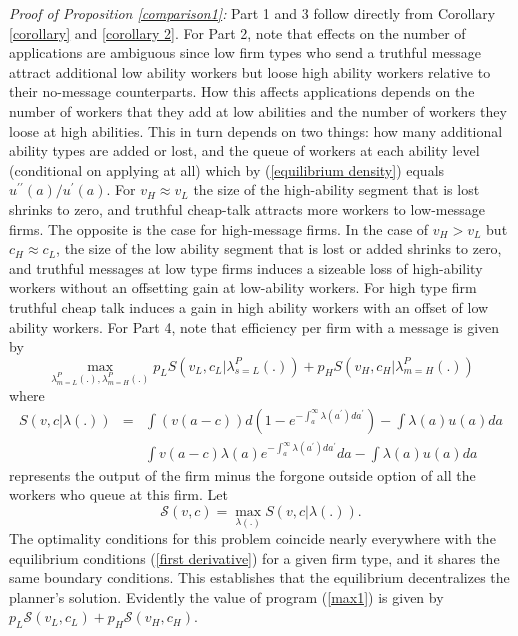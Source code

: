 \documentclass[12pt]{article}
\begin{document}
\noindent \textit{Proof of Proposition \ref{comparison1}:} Part 1 and 3 follow
directly from Corollary \ref{corollary} and \ref{corollary 2}. For Part 2, note
that effects on the number of applications are ambiguous since low firm
types who send a truthful message attract additional low ability workers but loose high ability workers relative to their no-message counterparts.
How this affects applications depends on the number of workers that they add at low abilities and the number of workers they loose at high abilities. This in turn depends on two things: how many additional ability types are added or lost, and the queue of workers at each ability level (conditional on applying at all) which by
(\ref{equilibrium density}) equals $u^{\prime \prime }(a)/u^{\prime }(a)$. For $v_{H}\approx v_{L}$ the size of the high-ability segment that is lost shrinks to zero, and
truthful cheap-talk attracts more workers to low-message firms. The opposite
is the case for high-message firms. In the case of $v_{H}> v_L$ but $c_H \approx c_L$, the size of the low ability segment that is lost or added shrinks to zero, and truthful messages at low type firms induces a sizeable loss of high-ability workers without an offsetting gain at low-ability workers. For high type firm truthful cheap talk induces a gain in high ability workers with an offset of low ability workers. For Part 4, note that efficiency per firm with a message is given by 
\begin{equation}
\max_{\lambda _{m=L}^{P}(.),\lambda _{m=H}^{P}(.)}p_{L}S(v_{L},c_{L}|\lambda _{s=L}^{P}(.))+p_{H}S(v_{H},c_{H}|\lambda
_{m=H}^{P}(.))  \label{max1}
\end{equation}%
where 
\begin{eqnarray*}
S(v,c|\lambda (.)) &=&\int \left( v(a-c)\right) d\left(
1-e^{-\int_{a}^{\infty }\lambda (a^{\prime })da^{\prime }}\right) -\int
\lambda (a)u(a)da \\
&&\int v(a-c)\lambda (a)e^{-\int_{a}^{\infty }\lambda (a^{\prime
})da^{\prime }}da-\int \lambda (a)u(a)da
\end{eqnarray*}%
represents the output of the firm minus the forgone outside option of all
the workers who queue at this firm. Let 
\begin{equation}
\mathcal{S}(v,c)=\max_{\lambda (.)}S(v,c|\lambda (.)).  \label{max-by-type}
\end{equation}%
The optimality conditions for this problem coincide nearly everywhere with
the equilibrium conditions (\ref{first derivative}) for a given firm type,
and it shares the same boundary conditions. This establishes that the
equilibrium decentralizes the planner's solution. Evidently the value of
program (\ref{max1}) is given by $p_{L}\mathcal{S}(v_{L},c_{L})+p_{H}\mathcal{S}(v_{H},c_{H}).$
\end{document}

